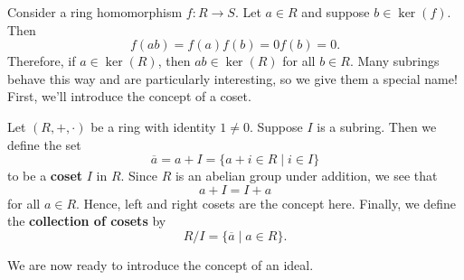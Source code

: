     Consider a ring
    homomorphism $f: R \to S$. Let $a \in R$ and
    suppose $b \in \ker(f)$. Then 
    \[
        f(ab) = f(a)f(b) = 0f(b) = 0.
    \]
    Therefore, if $a \in \ker(R)$, then $ab \in \ker(R)$ for all
    $b \in R$. Many subrings behave this way and are particularly
    interesting, so we give them a special name! 
    \\
    First, we'll introduce the concept of a coset.
    \begin{definition}
        Let $(R, +, \cdot)$ be a ring with identity $1 \ne 0$. Suppose $I$ is
        a subring. Then we define the set 
        \[
            \overline{a} = a + I = \{a + i \in R \mid i \in I\}   
        \]
        to be a \textbf{coset} $I$ in $R$. Since $R$ is an abelian
        group under addition, we see that 
        \[
            a + I = I + a
        \]
        for all $a \in R$. Hence, left and right cosets are the
        concept here. Finally, we define the \textbf{collection of
        cosets} by 
        \[
            R/I = \{\overline{a} \mid a \in R\}.               
        \]
    \end{definition}
    We are now ready to introduce the concept of an ideal. 
